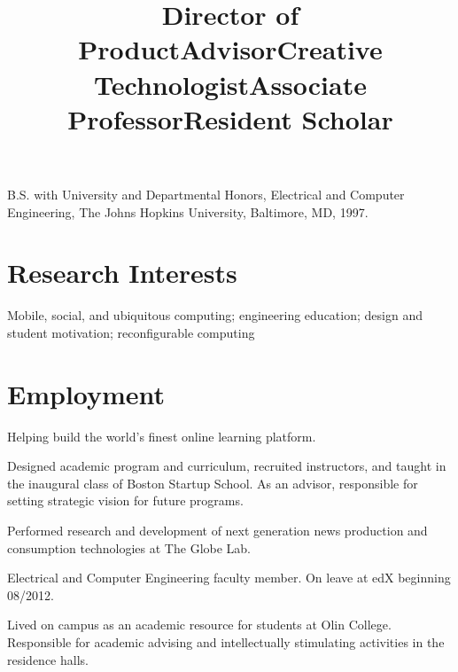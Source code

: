 \documentclass[line]{res}
\begin{document}
\begin{resume}
	B.S. with University and Departmental Honors, Electrical and Computer Engineering, The Johns Hopkins University, Baltimore, MD, 1997.
	
	\section{\sc Research Interests}
	
	Mobile, social, and ubiquitous computing; engineering education; design and student motivation; reconfigurable computing
	
	\section{\sc Employment}

	\title{Director of Product} 
	 
	\begin{position}
		Helping build the world's finest online learning platform.
	\end{position}
	
	\title{Advisor} 
	 
	\begin{position}
		Designed academic program and curriculum, recruited instructors, and taught in the inaugural class of Boston Startup School. As an advisor, responsible for setting strategic vision for future programs.
	\end{position}
	
	\title{Creative Technologist} 
	  
	\begin{position}
		Performed research and development of next generation news production and consumption
    technologies at The Globe Lab.
	\end{position}
	
	\title{Associate Professor} 
	  
	\begin{position}
		Electrical and Computer Engineering faculty member. On leave at edX beginning 08/2012.
	\end{position}
	
	\title{Resident Scholar} 
	  
	\begin{position}
		Lived on campus as an academic resource for students at Olin College. Responsible for academic advising and intellectually stimulating activities in the residence halls.
	\end{position}
	

\end{resume}
\end{document}
